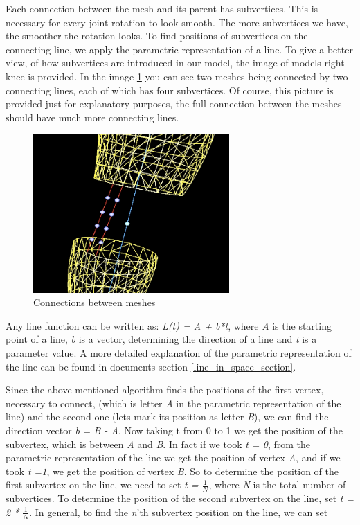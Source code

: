 \documentclass[times, 10pt,twocolumn]{article}
\begin{document}
Each connection between the mesh and its parent has subvertices. This is necessary for every joint rotation to look smooth. The more subvertices we have, the smoother the rotation looks. To find positions of subvertices on the connecting line, we apply the parametric representation of a line. To give a better view, of how subvertices are introduced in our model, the image of models right knee is provided. In the image \ref{our_mesh_connection} you can see two meshes being connected by two connecting lines, each of which has four subvertices. Of course, this picture is provided just for explanatory purposes, the full connection between the meshes should have much more connecting lines.

\begin{figure}[H]
  \caption{Connections between meshes}
  \label{our_mesh_connection}
  \centering
  \includegraphics[width=75mm]{images/mesh_connection.jpg}
\end{figure}

Any line function can be written as: \emph{L(t) = A + b*t}, where \emph{A} is the starting point of a line, \emph{b} is a vector, determining the direction of a line and \emph{t} is a parameter value. A more detailed explanation of the parametric representation of the line can be found in documents section \ref{line_in_space_section}.

Since the above mentioned algorithm finds the positions of the first vertex, necessary to connect, (which is letter \emph{A} in the parametric representation of the line) and the second one (lets mark its position as letter \emph{B}), we can find the direction vector \emph{b = B - A}. Now taking t from 0 to 1 we get the position of the subvertex, which is between \emph{A} and \emph{B}. In fact if we took \emph{t = 0}, from the parametric representation of the line we get the position of vertex \emph{A}, and if we took \emph{t =1}, we get the position of vertex \emph{B}. So to determine the position of the first subvertex on the line, we need to set \emph{t = $\frac{1}{N}$}, where \emph{N} is the total number of subvertices. To determine the position of the second subvertex on the line, set \emph{t = 2 * $\frac{1}{N}$}. In general, to find the \emph{n}'th subvertex position on the line, we can set
\end{document}

